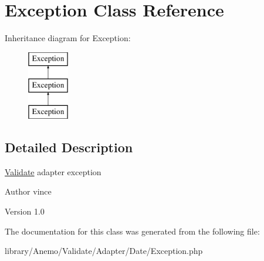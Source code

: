 \hypertarget{class_anemo_1_1_validate_1_1_adapter_1_1_date_1_1_exception}{
\section{Exception Class Reference}
\label{class_anemo_1_1_validate_1_1_adapter_1_1_date_1_1_exception}
}
Inheritance diagram for Exception:\begin{figure}[H]
\begin{center}
\leavevmode
\includegraphics[height=3.000000cm]{class_anemo_1_1_validate_1_1_adapter_1_1_date_1_1_exception}
\end{center}
\end{figure}


\subsection{Detailed Description}
\hyperlink{class_anemo_1_1_validate}{Validate} adapter exception \begin{DoxyAuthor}{Author}
vince 
\end{DoxyAuthor}
\begin{DoxyVersion}{Version}
1.0 
\end{DoxyVersion}


The documentation for this class was generated from the following file:\begin{DoxyCompactItemize}
\item 
library/Anemo/Validate/Adapter/Date/Exception.php\end{DoxyCompactItemize}
